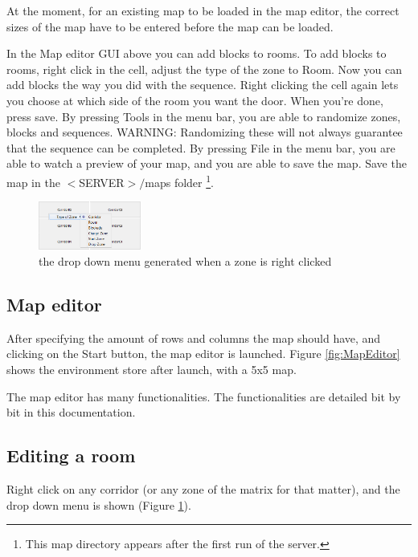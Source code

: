 At the moment, for an existing map to be loaded in the map editor, the correct sizes of the map have to be entered before the map can be loaded.

In the Map editor GUI above you can add blocks to rooms. To add blocks to rooms, right click in the cell, adjust the type of the zone to Room. Now you can add blocks the way you did with the sequence. Right clicking the cell again lets you choose at which side of the room you want the door. When you're done, press save. 
By pressing Tools in the menu bar, you are able to randomize zones, blocks and sequences. WARNING: Randomizing these will not always guarantee that the sequence can be completed.
By pressing File in the menu bar, you are able to watch a preview of your map, and you are able to save the map. Save the map in the $<$SERVER$>/$maps folder \footnote[1]{This map directory appears after the first run of the server.}.  


\begin{figure}
  \begin{center}
	\includegraphics[width=0.3\textwidth]{EnvironmentStore/DropDownMenuRoom.png}
  \end{center}
  \caption{the drop down menu generated when a zone is right clicked}\label{fig:DropDownMenuRoom}
\end{figure}

\subsection{Map editor}
After specifying the amount of rows and columns the map should have, and clicking on the Start button, 
the map editor is launched. Figure \ref{fig:MapEditor} shows the environment store after launch, with a 5x5 map.

The map editor has many functionalities. The functionalities are detailed bit by bit in this documentation.


\subsection{Editing a room}

Right click on any corridor (or any zone of the matrix for that matter), and the drop down menu is shown (Figure \ref{fig:DropDownMenuRoom}).


